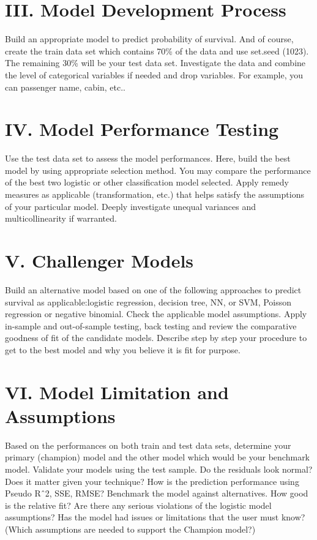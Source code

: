 \documentclass[
  letterpaper,
  DIV=11,
  numbers=noendperiod]{scrartcl}
\begin{document}
\section{III. Model Development
Process}\label{iii.-model-development-process}

Build an appropriate model to predict probability of survival. And of
course, create the train data set which contains 70\% of the data and
use set.seed (1023). The remaining 30\% will be your test data set.
Investigate the data and combine the level of categorical variables if
needed and drop variables. For example, you can passenger name, cabin,
etc..

\section{IV. Model Performance
Testing}\label{iv.-model-performance-testing}

Use the test data set to assess the model performances. Here, build the
best model by using appropriate selection method. You may compare the
performance of the best two logistic or other classification model
selected. Apply remedy measures as applicable (transformation, etc.)
that helps satisfy the assumptions of your particular model. Deeply
investigate unequal variances and multicollinearity if warranted.

\section{V. Challenger Models}\label{v.-challenger-models}

Build an alternative model based on one of the following approaches to
predict survival as applicable:logistic regression, decision tree, NN,
or SVM, Poisson regression or negative binomial. Check the applicable
model assumptions. Apply in-sample and out-of-sample testing, back
testing and review the comparative goodness of fit of the candidate
models. Describe step by step your procedure to get to the best model
and why you believe it is fit for purpose.

\section{VI. Model Limitation and
Assumptions}\label{vi.-model-limitation-and-assumptions}

Based on the performances on both train and test data sets, determine
your primary (champion) model and the other model which would be your
benchmark model. Validate your models using the test sample. Do the
residuals look normal? Does it matter given your technique? How is the
prediction performance using Pseudo Rˆ2, SSE, RMSE? Benchmark the model
against alternatives. How good is the relative fit? Are there any
serious violations of the logistic model assumptions? Has the model had
issues or limitations that the user must know? (Which assumptions are
needed to support the Champion model?)
\end{document}
